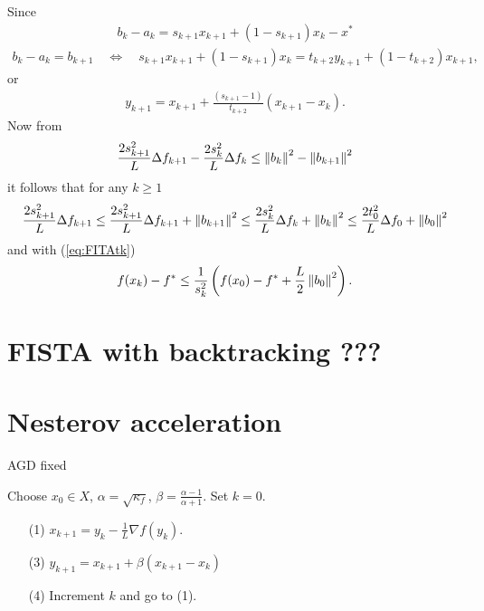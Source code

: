 \documentclass[12pt,english]{article}
\begin{document}
Since
%
\begin{align*}
b_k-a_k =  s_{k+1}x_{k+1}+ (1-s_{k+1}) x_k - x^*
\end{align*}
%
%
\begin{align*}
b_k-a_k = b_{k+1} \quad\Leftrightarrow\quad s_{k+1}x_{k+1}+ (1-s_{k+1}) x_k  =  t_{k+2}y_{k+1}+(1-t_{k+2}) x_{k+1},
\end{align*}
%
or
%
\begin{align*}
y_{k+1} = x_{k+1} + \frac{(s_{k+1}-1)}{t_{k+2}}(x_{k+1}- x_k).
\end{align*}
%
Now from 
%
\begin{equation}\label{eq:}
\frac{2s_{k+1}^2}{L} \Delta f_{k+1} - \frac{2s_{k}^2}{L} \Delta f_k \le  \left\|b_{k}\right\|^2 - \left\|b_{k+1}\right\|^2
\end{equation}
%
it follows that for any $k\ge1$
%
\begin{align*}
\frac{2s_{k+1}^2}{L} \Delta f_{k+1} \le \frac{2s_{k+1}^2}{L} \Delta f_{k+1} + \left\|b_{k+1}\right\|^2 \le \frac{2s_{k}^2}{L} \Delta f_{k} + \left\|b_{k}\right\|^2
\le \frac{2t_{0}^2}{L} \Delta f_{0} + \left\|b_{0}\right\|^2
\end{align*}
%
and with (\ref{eq:FITAtk})
%
\begin{equation}\label{eq:}
f(x_k) - f^* \le \frac{1}{s_{k}^2}\left( f(x_0) - f^*  + \frac{L}{2}\left\|b_{0}\right\|^2\right).
\end{equation}
%
%
%
\section{FISTA with backtracking ???}\label{sec:}
%
%
%
%
\section{Nesterov acceleration}\label{sec:}
%
%
\begin{yellow}
\begin{algorithm}[H]
\caption{AGD fixed} 
\label{algorithm:AGDfixed} 
%
Choose $x_0\in X$, $\alpha=\sqrt{\kappa_f}$, $\beta=\frac{\alpha-1}{\alpha+1}$. Set $k=0$.
%
\begin{itemize}
\item[(1)] $x_{k+1} = y_k- \frac1L \nabla f(y_k)$.
\item[(3)] $y_{k+1} = x_{k+1} + \beta(x_{k+1}-x_{k})$
\item[(4)] Increment $k$ and go to (1).
\end{itemize}
%
\end{algorithm}
\end{yellow}
%
\end{document}

